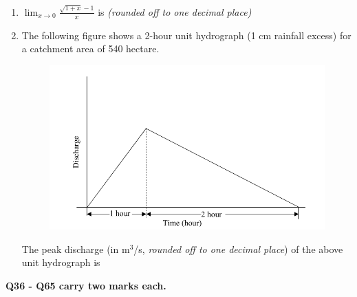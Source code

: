 \documentclass[12pt,a4paper]{article}
\begin{document}
\begin{enumerate}
   \item $\displaystyle \lim_{x \to 0} \frac{\sqrt{1+x} - 1}{x}$ is \underline{\hspace{2cm}} \textit{(rounded off to one decimal place)}

   \item The following figure shows a 2-hour unit hydrograph (1 cm rainfall excess) for a catchment area of 540 hectare.

         \begin{figure}[H]
            \centering
            \includegraphics[scale=0.6]{q35}
            \label{fig:q35}
         \end{figure}

         The peak discharge (in m$^3$/s, \textit{rounded off to one decimal place}) of the above unit hydrograph is \underline{\hspace{2cm}}
\end{enumerate}

\normalsize\textbf{Q36 - Q65 carry two marks each.}
\end{document}
